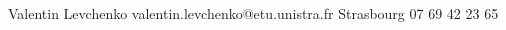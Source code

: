 \documentclass[lighthipster]{simplehipstercv}
\newlength{\rightcolwidth}
\begin{document}
\begin{paracol}{2}
\begin{minipage}[t]{0.3\textwidth}
\end{minipage}



\vfill{} %

\setlength{\parindent}{0pt}
\begin{minipage}[t]{\rightcolwidth}
\begin{center}\fontfamily{\sfdefault}\selectfont \color{black!70}
{\small Valentin Levchenko  valentin.levchenko@etu.unistra.fr  Strasbourg  07 69 42 23 65 {}
}
\end{center}
\end{minipage}

\end{paracol}
\end{document}
